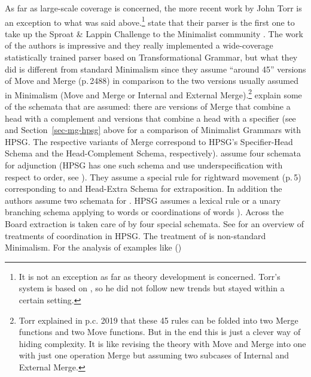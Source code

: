 As\label{page-torr-implementation-beginning} far as large-scale coverage is concerned, the more recent work by John Torr is an
exception to what was said above.\footnote{%
  It is not an exception as far as theory development is concerned. Torr's system is based on
  , so he did not follow new trends but stayed within a certain setting.
} \citet*{TSSC2019a} state that their parser is the first one to take up the Sproat 
\& Lappin Challenge to the Minimalist community \citeyearpar{SL2005a}. The work of the authors is
impressive and they really implemented a wide-coverage statistically trained parser based on
Transformational Grammar, but what they did is different from standard Minimalism since they assume
``around 45'' versions of Move and Merge (p.\,2488) in comparison to the two versions usually
assumed in Minimalism (Move and Merge or Internal and External Merge).\footnote{%
 Torr explained in p.c. 2019 that these 45 rules can be folded into two Merge functions and two Move
 functions. But in the end this is just a clever way of hiding complexity. It is like \citet[]{Chomsky2005a}
 revising the theory with Move and Merge into one with just one operation Merge but assuming two
 subcases of Internal and External Merge.
} \citet{TS2016a} explain some of the schemata that are assumed: there are versions of Merge that
combine a head with a complement and versions that combine a head with a specifier (see
\citet{MuellerUnifying} and Section~\ref{sec-mg-hpsg} above for a comparison of Minimalist Grammars
with HPSG. The respective variants of Merge correspond to HPSG's Specifier-Head Schema and the Head-Complement Schema,
respectively). \citet[]{TS2016a} assume four schemata for adjunction (HPSG has one such schema and use
underspecification with respect to order, see ). They assume a special rule
for rightward movement (p.\,5) corresponding to  and  Head-Extra
Schema for extraposition. In addition the authors assume two schemata for . HPSG
assumes a lexical rule or a unary branching schema applying to words or coordinations of words
\parencites{MuellerGS}[Section~5.1]{MuellerOrder}). Across the Board extraction \citep{Ross67a} is taken care of by
four special schemata. See \citet{AC2020a} for an overview of treatments of coordination in
HPSG. The treatment of  is non-standard Minimalism. For the analysis of examples like ()
